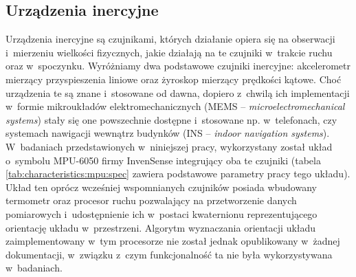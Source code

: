 																																							
																																									
\subsection{Urządzenia inercyjne}\label{sec:characteristics:imu}
																																									
Urządzenia inercyjne są czujnikami, których działanie opiera się na obserwacji i~mierzeniu wielkości fizycznych, jakie działają na te czujniki w~trakcie ruchu oraz w~spoczynku. Wyróżniamy dwa podstawowe czujniki inercyjne: akcelerometr mierzący przyspieszenia liniowe oraz żyroskop mierzący prędkości kątowe. Choć urządzenia te są znane i~stosowane od dawna, dopiero z~chwilą ich implementacji w~formie mikroukładów elektromechanicznych (MEMS -- \emph{microelectromechanical systems}) stały się one powszechnie dostępne i~stosowane np. w~telefonach, czy systemach nawigacji wewnątrz budynków (INS -- \emph{indoor navigation systems}). W~badaniach przedstawionych w~niniejszej pracy, wykorzystany został układ o~symbolu MPU-6050 firmy InvenSense integrujący oba te czujniki (tabela \ref{tab:characteristics:mpu:spec} zawiera podstawowe parametry pracy tego układu). Układ ten oprócz wcześniej wspomnianych czujników posiada wbudowany termometr oraz procesor ruchu pozwalający na przetworzenie danych pomiarowych i~udostępnienie ich w~postaci kwaternionu reprezentującego orientację układu w~przestrzeni. Algorytm wyznaczania orientacji układu zaimplementowany w~tym procesorze nie został jednak opublikowany w~żadnej dokumentacji, w~związku z~czym funkcjonalność ta nie była wykorzystywana w~badaniach.
																																									
